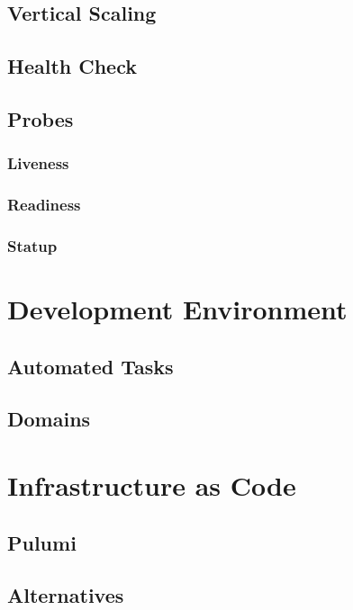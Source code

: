 \section{Vertical Scaling}

\section{Health Check}

\section{Probes}

\subsection{Liveness}

\subsection{Readiness}

\subsection{Statup}

\chapter{Development Environment}

\section{Automated Tasks}

\section{Domains}

\chapter{Infrastructure as Code}

\section{Pulumi}

\section{Alternatives}

